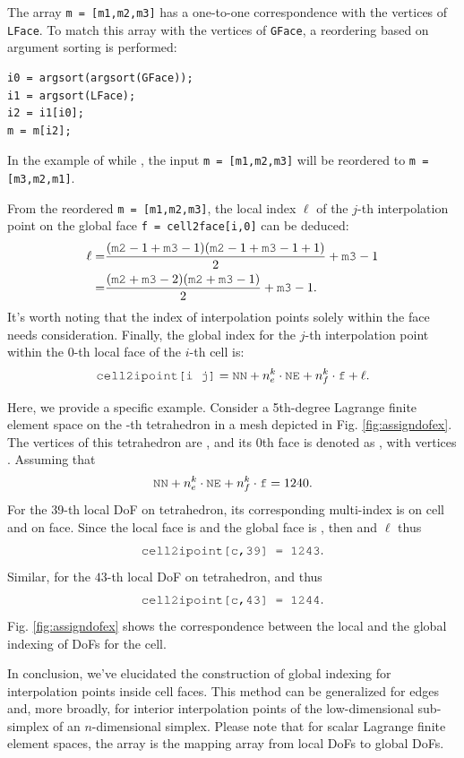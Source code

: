 \documentclass[mathpazo]{cicp}
\begin{document}
The array \lstinline{m = [m1,m2,m3]} has a
one-to-one correspondence with the vertices of \lstinline{LFace}. To match this
array with the vertices of \lstinline{GFace}, a reordering based on argument
sorting is performed:
\begin{lstlisting}
i0 = argsort(argsort(GFace));
i1 = argsort(LFace);
i2 = i1[i0];
m = m[i2];
\end{lstlisting}
In the example of  while , the input \lstinline{m = [m1,m2,m3]} will be reordered to \lstinline{m = [m3,m2,m1]}.

From the reordered \lstinline{m = [m1,m2,m3]}, the local index \(\ell\) of the
$j$-th interpolation point on the global face \lstinline{f = cell2face[i,0]} can
be deduced:
\begin{align*}
   \ell = & \frac{(\mc{m2}-1 + \mc{m3}-1)(\mc{m2}-1 + \mc{m3}-1 + 1)}{2} + \mc{m3}-1 \\
   =& \frac{(\mc{m2} + \mc{m3} -2)(\mc{m2} + \mc{m3} - 1)}{2} + \mc{m3}-1.
\end{align*}
It's worth noting that the index of interpolation points solely within the face
needs consideration. Finally, the global index for the $j$-th
interpolation point within the $0$-th local face of the $i$-th cell is:
\[
    \mc{cell2ipoint[i j]} = \mc{NN} + n_e^k\cdot \mc{NE} + n_f^k\cdot \mc{f} + \ell.
\]

Here, we provide a specific example. Consider a 5th-degree Lagrange finite
element space on the -th tetrahedron in a
mesh depicted in Fig. \ref{fig:assigndofex}. The vertices of this tetrahedron
are \mc{[5,17,0,21]}, and its 0th face is denoted as , with vertices 
\mc{[0,17,21]}. Assuming that 
\[
    \mc{NN} + n_e^k\cdot \mc{NE} + n_f^k\cdot \mc{f} = 1240.
\]
For the 39-th local DoF on tetrahedron, 
its corresponding multi-index is \mc{[0,3,1,1]} on cell and  \mc{[3,1,1]} 
on face. Since the local face is \mc{[17,0,21]} and the global face is
\mc{[0,17,21]}, then  and $\ell$  thus
\[
    \mc{cell2ipoint[c,39] = 1243}.
\]
Similar, for the $43$-th local DoF on tetrahedron,  and
 thus
\[
    \mc{cell2ipoint[c,43] = 1244}.
\]
Fig. \ref{fig:assigndofex} shows the correspondence between the local and the global indexing of DoFs for the cell.

In conclusion, we've elucidated the construction of global indexing for
interpolation points inside cell faces. This method can be generalized for edges
and, more broadly, for interior interpolation points of the low-dimensional
sub-simplex of an \(n\)-dimensional simplex. Please note that for scalar
Lagrange finite element spaces, the  array is the mapping array
from local DoFs to global DoFs.
\end{document}
